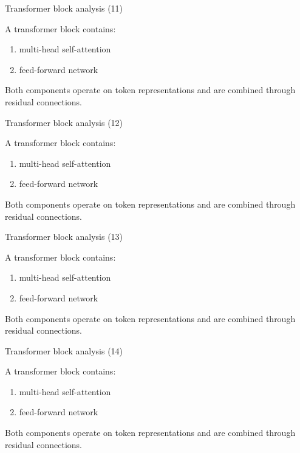 \documentclass[aspectratio=169]{beamer}
\begin{document}
\begin{frame}{Transformer block analysis (11)}

A transformer block contains:

\begin{enumerate}
\item multi-head self-attention
\item feed-forward network
\end{enumerate}

Both components operate on token representations and are
combined through residual connections.

\end{frame}


\begin{frame}{Transformer block analysis (12)}

A transformer block contains:

\begin{enumerate}
\item multi-head self-attention
\item feed-forward network
\end{enumerate}

Both components operate on token representations and are
combined through residual connections.

\end{frame}


\begin{frame}{Transformer block analysis (13)}

A transformer block contains:

\begin{enumerate}
\item multi-head self-attention
\item feed-forward network
\end{enumerate}

Both components operate on token representations and are
combined through residual connections.

\end{frame}


\begin{frame}{Transformer block analysis (14)}

A transformer block contains:

\begin{enumerate}
\item multi-head self-attention
\item feed-forward network
\end{enumerate}

Both components operate on token representations and are
combined through residual connections.

\end{frame}
\end{document}
